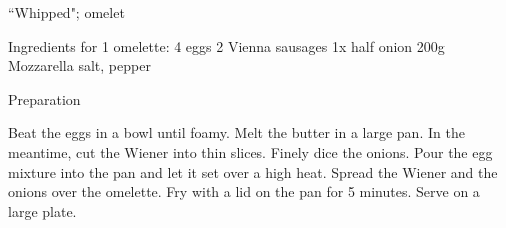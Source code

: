 
“Whipped"; omelet

Ingredients for 1 omelette:
4 eggs
2 Vienna sausages
1x half onion
200g Mozzarella
salt, pepper

Preparation

Beat the eggs in a bowl until foamy.
Melt the butter in a large pan.
In the meantime, cut the Wiener into thin slices.
Finely dice the onions.
Pour the egg mixture into the pan and let it set over a high heat.
Spread the Wiener and the onions over the omelette.
Fry with a lid on the pan for 5 minutes.
Serve on a large plate.

